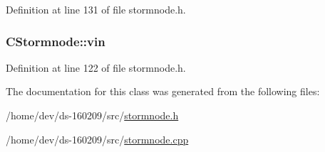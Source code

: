 Definition at line 131 of file stormnode.\+h.

\hypertarget{class_c_stormnode_a62f5b0f436ca313afd612b07d687127f}{}
\subsubsection[{vin}]{ C\+Stormnode\+::vin}\label{class_c_stormnode_a62f5b0f436ca313afd612b07d687127f}


Definition at line 122 of file stormnode.\+h.



The documentation for this class was generated from the following files\+:\begin{DoxyCompactItemize}
\item 
/home/dev/ds-\/160209/src/\hyperlink{stormnode_8h}{stormnode.\+h}\item 
/home/dev/ds-\/160209/src/\hyperlink{stormnode_8cpp}{stormnode.\+cpp}\end{DoxyCompactItemize}
